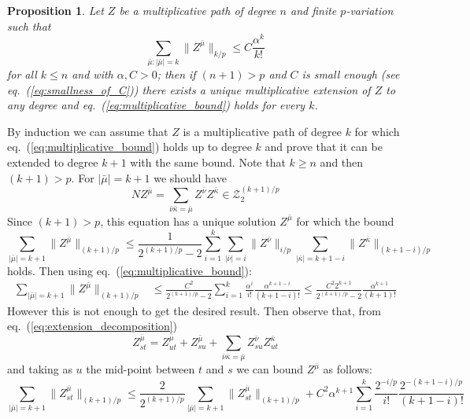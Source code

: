 \documentclass[a4paper,12pt,reqno]{amsproc}
\newcommand{\NN}{N}
\newcommand{\ZZ}{\mathcal{Z}}
\newcommand{\norm}[1]{\lVert #1\rVert}
\newtheorem{proposition}{Proposition}
\begin{document}
\begin{proposition}
Let $Z$ be a multiplicative path of degree $n$ and finite $p$-variation such that
\begin{equation}
  \label{eq:multiplicative_bound}
 \sum_{\bar\mu : |\bar\mu|=k}\norm{Z^{\bar\mu}}_{k/p} \le C \frac{\alpha^{k}}{k!} 
\end{equation}
for all $k \le n$ and with $\alpha,C >0$; then if $(n+1) > p$ and $C$
is small enough (see eq.~(\ref{eq:smallness_of_C})) there exists a unique
multiplicative extension of $Z$ to any degree and
eq.~(\ref{eq:multiplicative_bound}) holds for every $k$.
\end{proposition}
\proof
By induction we can assume that $Z$ is a multiplicative path of degree
$k$ for which eq.~(\ref{eq:multiplicative_bound}) holds up to degree
$k$ and prove that it can be extended to degree $k+1$ with the same
bound. Note that $k \ge n$ and then $(k+1) > p$.
For $|\bar\mu|=k+1$ we should have
\begin{equation}
\label{eq:extension_decomposition}
  \NN Z^{\bar\mu} = \sum_{\bar\nu\bar \kappa = \bar\mu} Z^{\bar\nu}
  Z^{\bar\kappa} \in \ZZ_2^{(k+1)/p}
\end{equation}
Since $(k+1) > p$, this equation has a unique solution $Z^{\bar\mu}$
for which the bound
\begin{equation*}
  \sum_{|\bar\mu| = k+1} \norm{Z^{\bar\mu}}_{(k+1)/p} \le  \frac{1}{2^{(k+1)/p}-2} 
\sum_{i=1}^k \sum_{|\bar\nu|=i}\norm{Z^{\bar\nu}}_{i/p} \sum_{|\bar\kappa|=k+1-i}
  \norm{Z^{\bar\kappa}}_{(k+1-i)/p}
\end{equation*}
holds. Then using eq.~(\ref{eq:multiplicative_bound}):
\begin{equation*}
\begin{split}
  \sum_{|\bar\mu| = k+1}\norm{Z^{\bar\mu}}_{(k+1)/p} & \le  \frac{C^2}{2^{(k+1)/p}-2}
\sum_{i=1}^k 
\frac{\alpha^{i}}{i!} \frac{\alpha^{k+1-i}}{(k+1-i)!} \le
 \frac{C^2 2^{k+1}}{2^{(k+1)/p}-2} \frac{\alpha^{k+1}}{(k+1)!}
\end{split}
\end{equation*}
However this is not enough to get the desired result. Then observe
that, from eq.~(\ref{eq:extension_decomposition})
$$
 Z^{\bar\mu}_{st} = Z^{\bar\mu}_{ut} + Z^{\bar\mu}_{su} + \sum_{\bar\nu\bar \kappa = \bar\mu} Z^{\bar\nu}_{su}
  Z^{\bar\kappa}_{ut} 
$$
and taking as $u$ the mid-point between $t$ and $s$ we can bound
$Z^{\bar \mu}$ as
follows:
\begin{equation*}
  \sum_{|\bar\mu| = k+1} \norm{Z^{\bar\mu}_{st}}_{(k+1)/p} \le
  \frac{2}{2^{(k+1)/p}} \sum_{|\bar\mu| = k+1}
  \norm{Z^{\bar\mu}_{st}}_{(k+1)/p} +C^2 \alpha^{k+1}
\sum_{i=1}^k 
\frac{2^{-i/p}}{i!} \frac{2^{-(k+1-i)/p}}{(k+1-i)!} 
\end{equation*}
\end{document}
